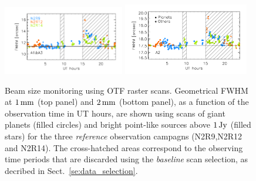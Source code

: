 \begin{figure}[ht!]
  \begin{center}
    \includegraphics[clip=true, trim={0.9cm, 0.5cm, 0.5cm, 0.5cm}, width=0.4725\textwidth]{Figures/Beam_monitoring_with_otfs_vs_ut_1mm.pdf}
    \includegraphics[clip=true, trim={0.5cm, 0.5cm, 0.5cm, 0.5cm}, width=0.4875\textwidth]{Figures/Beam_monitoring_with_otfs_vs_ut_a2.pdf}
    \caption[Beam size monitoring using OTF scans]{Beam size
      monitoring using OTF raster scans. Geometrical FWHM at $1\,\rm{mm}$ (top panel)
      and $2\,\rm{mm}$ (bottom panel), as a function of the
      observation time in UT hours, are shown using scans of giant
      planets (filled circles) and bright point-like sources above
      $1\,\rm{Jy}$ (filled stars) for the three \emph{reference}
      observation campagns (N2R9,N2R12 and N2R14). The cross-hatched areas
      correspond to the observing time periods that are discarded using
      the \emph{baseline} scan selection, as decribed in Sect.~\ref{se:data_selection}.} 
\label{fig:beam_monitoring_otf}
  \end{center}
\end{figure}


